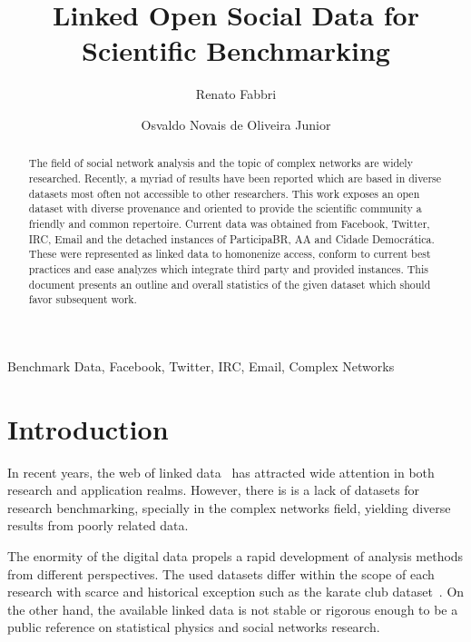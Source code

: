 \documentclass[review]{elsarticle}
\begin{document}
%
\begin{frontmatter}
%
\title{Linked Open Social Data for Scientific Benchmarking}
%
\author[pwr]{Renato Fabbri}
%
\author[pwr]{Osvaldo Novais de Oliveira Junior}
%
\address[pwr]{S\~ao Carlos Institute of Physics, S\~ao Paulo
University, Brazil}
%
%
\begin{abstract}
The field of social network analysis and the topic of complex networks
are widely researched.
Recently, a myriad of results have been reported which are based in
diverse datasets most often not accessible to other researchers.
This work exposes an open dataset with diverse provenance and oriented
to provide the scientific community a friendly and common repertoire.
Current data was obtained from Facebook, Twitter, IRC, Email and the
detached instances of ParticipaBR, AA and Cidade Democr\'atica.
These were represented as linked data to homonenize access,
conform to current best practices and ease analyzes which integrate third
party and provided instances.
This document presents an outline and overall statistics of the given
dataset which should favor subsequent work.
\end{abstract}
%
\begin{keyword}
Benchmark Data, Facebook, Twitter, IRC, Email, Complex Networks
\end{keyword}

\end{frontmatter}

\section{Introduction}
In recent years, the web of linked data~\cite{lee1} has attracted wide attention in
both research and application realms.
However, there is is a lack of datasets for research benchmarking,
specially in the complex networks field, yielding diverse results from 
poorly related data.

The enormity of the digital data propels a rapid development of analysis methods
from different perspectives.
The used datasets differ within the scope of each research with
scarce and historical exception such as the
karate club dataset~\cite{newmanBook}.
On the other hand, the available linked data is not 
stable or rigorous enough to be
a public reference on statistical physics and social networks research.
 
\end{document}
